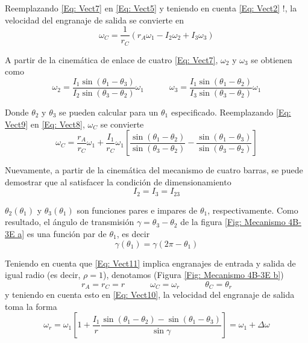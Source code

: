 \documentclass[12pt, final]{extarticle}
\begin{document}
Reemplazando \eqref{Eq: Vect7} en \eqref{Eq: Vect5} y teniendo en cuenta
\eqref{Eq: Vect2} !, la velocidad del engranaje de salida se convierte en
\begin{equation}
   \omega_C=\frac{1}{r_C}(r_A\omega_1-I_2\omega_2+I_3\omega_3)
   \label{Eq: Vect8}
\end{equation}

A partir de la cinemática de enlace de cuatro \eqref{Eq: Vect7}, $\omega_2$ y
$\omega_3$ se obtienen como
\begin{equation}
   \omega_2=\frac{I_1\sin({\theta_1-\theta_3})}{I_2\sin({\theta_3-\theta_2})}\omega_1  \quad\quad \quad   \omega_3=\frac{I_1\sin({\theta_1-\theta_2})}{I_3\sin({\theta_3-\theta_2})}\omega_1
   \label{Eq: Vect9}
\end{equation}

Donde $\theta_2$ y $\theta_3$ se pueden calcular para un $\theta_1$
especificado. Reemplazando \eqref{Eq: Vect9} en \eqref{Eq: Vect8}, $\omega_C$ se
convierte
\begin{equation}
   \omega_C=\frac{r_A}{r_C}\omega_1+\frac{I_1}{r_C}\omega_1[\frac{\sin({\theta_1-\theta_2})}{\sin({\theta_3-\theta_2})}-\frac{\sin({\theta_1-\theta_3})}{\sin({\theta_3-\theta_2})}]
   \label{Eq: Vect10}
\end{equation}

Nuevamente, a partir de la cinemática del mecanismo de cuatro barras, se puede
demostrar que al satisfacer la condición de dimensionamiento
\begin{equation}
   I_2=I_3=I_{23}
   \label{Eq: Vect11}
\end{equation}

$\theta_2(\theta_1)$ y $\theta_3(\theta_1)$ son funciones pares e impares de
$\theta_1$, respectivamente. Como resultado, el ángulo de transmisión
$\gamma=\theta_3-\theta_2$ de la figura \ref{Fig: Mecanismo 4B-3E a} es una
función par de $\theta_1$, es decir
\begin{equation}
   \gamma(\theta_1)=\gamma(2\pi-\theta_1)
   \label{Eq: Vect12}
\end{equation}

Teniendo en cuenta que \eqref{Eq: Vect11} implica engranajes de entrada y salida
de igual radio (es decir, $\rho=1$), denotamos (Figura \ref{Fig: Mecanismo 4B-3E
b})
\begin{equation}
   r_A=r_C=r\quad\quad\quad \omega_C=\omega_r    \quad\quad\quad \theta_C=\theta_r
   \label{Eq: Vect13}
\end{equation}
y teniendo en cuenta esto en \eqref{Eq: Vect10}, la velocidad del engranaje de
salida toma la forma
\begin{equation}
    \omega_r=\omega_1[1+\frac{I_1}{r}\frac{\sin{(\theta_1-\theta_2)}-\sin{(\theta_1-\theta_3)}}{\sin{\gamma}}]=\omega_1+\Delta\omega
   \label{Eq: Vect14}
\end{equation}
\end{document}
